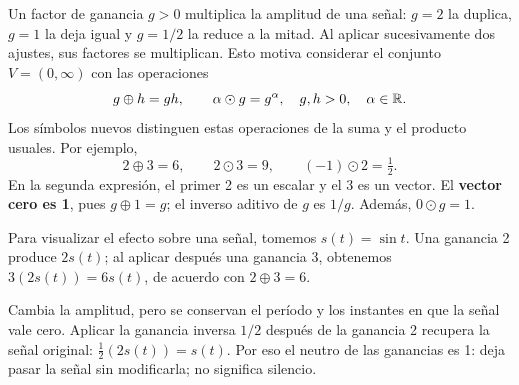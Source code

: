 \documentclass[compacto,10pt]{pubciencias-notas}
\begin{document}
\begin{ejem}\label{sem05cl02:ganancias}
    Un factor de ganancia $g>0$ multiplica la amplitud de una señal: $g=2$
    la duplica, $g=1$ la deja igual y $g=1/2$ la reduce a la mitad.
    Al aplicar sucesivamente dos ajustes, sus factores se multiplican.
    Esto motiva considerar el conjunto $V=(0,\infty)$ con las operaciones
    \[
        g\oplus h=gh,\qquad \alpha\odot g=g^{\alpha},
        \quad g,h>0,\quad\alpha\in\mathbb{R}.
    \]
    Los símbolos nuevos distinguen estas operaciones de la suma y el
    producto usuales. Por ejemplo,
    \[
        2\oplus3=6,\qquad 2\odot3=9,\qquad (-1)\odot2=\tfrac12.
    \]
    En la segunda expresión, el primer 2 es un escalar y el 3 es un vector.
    El \textbf{vector cero es 1}, pues $g\oplus1=g$; el inverso aditivo
    de $g$ es $1/g$. Además, $0\odot g=1$.

    Para visualizar el efecto sobre una señal, tomemos $s(t)=\sin t$.
    Una ganancia 2 produce $2s(t)$; al aplicar después una ganancia 3,
    obtenemos $3(2s(t))=6s(t)$, de acuerdo con $2\oplus3=6$.
    \begin{center}
    \end{center}
    Cambia la amplitud, pero se conservan el período y los instantes en que
    la señal vale cero. Aplicar la ganancia inversa $1/2$ después de la
    ganancia 2 recupera la señal original: $\tfrac12(2s(t))=s(t)$.
    Por eso el neutro de las ganancias es 1: deja pasar la señal sin
    modificarla; no significa silencio.
\end{ejem}
\end{document}
